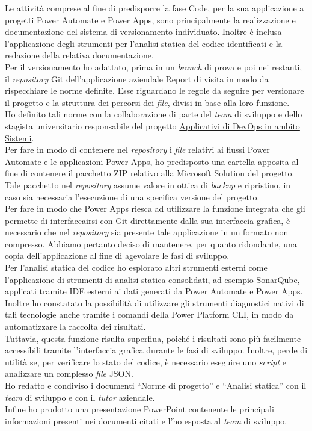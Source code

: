 Le attività comprese al fine di predisporre la fase Code, per la sua applicazione a progetti Power Automate e Power Apps, sono principalmente la realizzazione e documentazione del sistema di versionamento individuato.
Inoltre è inclusa l'applicazione degli strumenti per l'analisi statica del codice identificati e la redazione della relativa documentazione.\\
Per il versionamento ho adattato, prima in un \emph{branch} di prova e poi nei restanti, il \emph{repository} Git dell'applicazione aziendale Report di visita in modo da rispecchiare le norme definite.
Esse riguardano le regole da seguire per versionare il progetto e la struttura dei percorsi dei \emph{file}, divisi in base alla loro funzione.\\  
Ho definito tali norme con la collaborazione di parte del \emph{team} di sviluppo e dello stagista universitario responsabile del progetto \hyperref[stageDavide]{Applicativi di DevOps in ambito Sistemi}.\\ 
Per fare in modo di contenere nel \emph{repository} i \emph{file} relativi ai flussi Power Automate e le applicazioni Power Apps, ho predisposto una cartella apposita al fine di contenere il pacchetto ZIP relativo alla Microsoft Solution del progetto.\\ 
Tale pacchetto nel \emph{repository} assume valore in ottica di \emph{backup} e ripristino, in caso sia necessaria l'esecuzione di una specifica versione del progetto.\\  
Per fare in modo che Power Apps riesca ad utilizzare la funzione integrata che gli permette di interfaccairsi con Git direttamente dalla sua interfaccia grafica, è necessario che nel \emph{repository} sia presente tale applicazione in un formato non compresso.
Abbiamo pertanto deciso di mantenere, per quanto ridondante, una copia dell'applicazione al fine di agevolare le fasi di sviluppo.\\ 
Per l'analisi statica del codice ho esplorato altri strumenti esterni come l'applicazione di strumenti di analisi statica consolidati, ad esempio SonarQube, applicati tramite IDE esterni ai dati generati da Power Automate e Power Apps.\\  
Inoltre ho constatato la possibilità di utilizzare gli strumenti diagnostici nativi di tali tecnologie anche tramite i comandi della Power Platform CLI, in modo da automatizzare la raccolta dei risultati.\\ 
Tuttavia, questa funzione risulta superflua, poiché i risultati sono più facilmente accessibili tramite l'interfaccia grafica durante le fasi di sviluppo.
Inoltre, perde di utilità se, per verificare lo stato del codice, è necessario eseguire uno \emph{script} e analizzare un complesso \emph{file} JSON.\\ 
Ho redatto e condiviso i documenti “Norme di progetto” e “Analisi statica” con il \emph{team} di sviluppo e con il \emph{\emph{tutor}} aziendale.\\  
Infine ho prodotto una presentazione PowerPoint contenente le principali informazioni presenti nei documenti citati e l'ho esposta al \emph{team} di sviluppo. 


